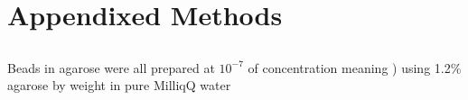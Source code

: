 \chapter{Appendixed Methods}
\section{}
Beads in agarose were all prepared at $10^{-7}$ of concentration meaning )
 using 1.2\% agarose by weight in pure MilliqQ water

